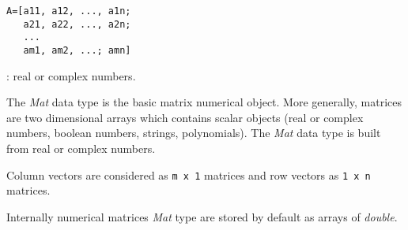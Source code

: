 
\begin{mandesc}
\end{mandesc}
\begin{calling_sequence}
\begin{verbatim}
A=[a11, a12, ..., a1n;
   a21, a22, ..., a2n;
   ...
   am1, am2, ...; amn]
\end{verbatim}
\end{calling_sequence}
\begin{parameters}
  \begin{varlist}
    : real or complex numbers.
  \end{varlist}
\end{parameters}

\begin{mandescription}

The \emph{Mat} data type is the basic matrix numerical object. 
More generally, matrices are two dimensional arrays which contains
scalar objects (real or complex numbers, boolean numbers, strings,
polynomials). The \emph{Mat} data type is built from real or complex
numbers.

Column vectors are considered as \verb!m x 1! matrices and row vectors
as \verb!1 x n! matrices.

Internally numerical matrices \emph{Mat} type are stored by default as 
arrays of \emph{double}. 
\end{mandescription}

